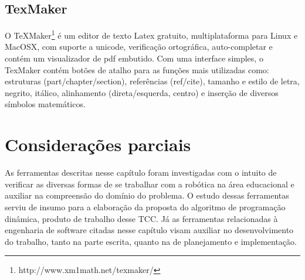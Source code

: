 \subsection{TexMaker}
O TeXMaker\footnote{http://www.xm1math.net/texmaker/} é um editor de texto Latex gratuito, multiplataforma para Linux e MacOSX, com suporte a unicode, verificação ortográfica, auto-completar e contém um visualizador de pdf embutido.
Com uma interface simples, o TexMaker contém botões de atalho para as funções mais utilizadas como: estruturas (part/chapter/section), referências (ref/cite), tamanho e estilo de letra, negrito, itálico, alinhamento (direta/esquerda, centro) e inserção de diversos símbolos matemáticos.

\section{Considerações parciais}
As ferramentas descritas nesse capítulo foram investigadas com o intuito de verificar as diversas formas de se trabalhar com a robótica na área educacional e auxiliar na compreensão do domínio do problema. O estudo dessas ferramentas serviu de insumo para a elaboração da proposta do algoritmo de programação dinâmica, produto de trabalho desse TCC. Já as ferramentas relacionadas à engenharia de software citadas nesse capítulo visam auxiliar no desenvolvimento do trabalho, tanto na parte escrita, quanto na de planejamento e implementação.